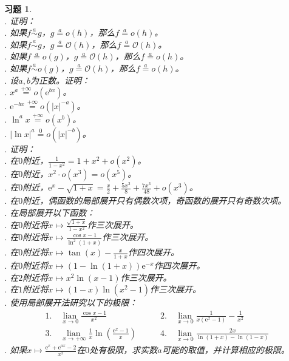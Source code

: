 \documentclass[12pt,UTF8]{ctexbook}
\newcommand{\lian}[1]{
    \underset{#1}{\operatorname{lian}\,}
}
\newcommand{\oveq}[1]{\overset{#1}{=}}
\newcommand{\olim}[1]{\mathit{o}\left(#1\right)}  %
\newcommand{\Olim}[1]{\mathcal{O}\left(#1\right)}  %
\newcommand{\eqlim}[1]{\overset{#1}{\sim}}  %
\theoremstyle{definition}
\theoremstyle{plain}
\newtheorem{xt}{习题}[section]
\begin{document}
\begin{xt}
    \mbox{} \\
    . 证明：\\
    . 如果$f \eqlim{a} g$，$g \oveq{a} \olim{h}$，那么$f \oveq{a} \olim{h}$。\\
    . 如果$f \eqlim{a} g$，$g \oveq{a} \Olim{h}$，那么$f \oveq{a} \Olim{h}$。\\
    . 如果$f \oveq{a} \olim{g}$，$g \oveq{a} \Olim{h}$，那么$f \oveq{a} \olim{h}$。\\
    . 如果$f \eqlim{a} \olim{g}$，$g \oveq{a} \Olim{h}$，那么$f \oveq{a} \olim{h}$。\\
    . 设$a, b$为正数。证明：\\
    . $x^a \oveq{+\infty} \olim{\mathrm{e}^{bx}}$。\\
    . $\mathrm{e}^{-bx} \oveq{+\infty} \olim{|x|^{-a}}$。\\
    . $\ln^{a}{x} \oveq{+\infty} \olim{x^{b}}$。\\
    . $|\ln{x}|^{a} \oveq{0} \olim{|x|^{-b}}$。\\
    . 证明：\\
    . 在$0$附近，$\frac{1}{1 - x^2} = 1 + x^2 + \olim{x^2}$。\\
    . 在$0$附近，$x^2 \cdot \olim{x^3} = \olim{x^5}$。\\
    . 在$0$附近，$\mathrm{e}^x - \sqrt{1 + x} = \frac{x}{2} + \frac{5x^2}{8} + \frac{7x^3}{48} + \olim{x^3}$。\\
    . 在$0$附近，偶函数的局部展开只有偶数次项，奇函数的展开只有奇数次项。\\
    . 在局部展开以下函数：\\
    . 在$0$附近将$x\mapsto \frac{\sqrt{1 + x}}{1 - x^2}$作三次展开。\\
    . 在$0$附近将$x\mapsto \frac{\cos{x} - 1}{\ln^2{(1 + x)}}$作三次展开。\\
    . 在$0$附近将$x\mapsto \tan{(x)} - \frac{x}{1 + x}$作四次展开。\\
    . 在$0$附近将$x\mapsto (1 - \ln{(1 + x)})\mathrm{e}^{-x}$作四次展开。\\
    . 在$2$附近将$x\mapsto x^2\ln{(x - 1)}$作三次展开。\\
    . 在$1$附近将$x\mapsto (1 - x)\ln{(x^2 - 1)}$作三次展开。\\
    . 使用局部展开法研究以下的极限：\\
    $$
    \begin{array}{ll}
        1. \quad \lian{x\to 0} \frac{\cos{x} - 1}{x^2} & \qquad 2. \quad \lian{x\to 0} \frac{1}{x \left(\mathrm{e}^x - 1\right)} - \frac{1}{x^2} \\
        3. \quad \lian{x\to +\infty} \frac{1}{x}\ln{\left(\frac{\mathrm{e}^x - 1}{x}\right)} & \qquad 4. \quad \lian{x\to 0} \frac{2x}{\ln{(1+x)} - \ln{(1-x)}} 
    \end{array}
    $$
    . 如果$x \mapsto \frac{\mathrm{e}^{x} + \mathrm{e}^{ax} - 2}{x^2}$在$0$处有极限，求实数$a$可能的取值，并计算相应的极限。
\end{xt}
\end{document}
